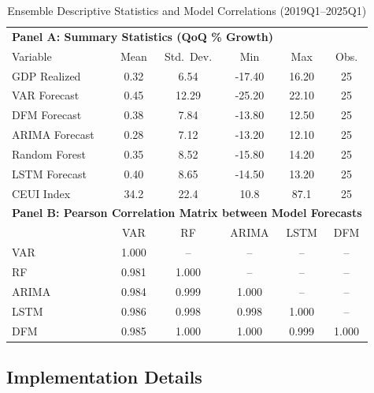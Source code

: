 \documentclass[12pt,a4paper]{article}
\theoremstyle{remark}
\begin{document}
\begin{table}[ht]
\centering
\begin{threeparttable}
\caption{Ensemble Descriptive Statistics and Model Correlations (2019Q1--2025Q1)}
\label{tab:descriptive_stats}
\scriptsize
\begin{tabular}{lccccc}
\toprule
\multicolumn{6}{l}{\textbf{Panel A: Summary Statistics (QoQ \% Growth)}} \\
Variable & Mean & Std.\ Dev. & Min & Max & Obs. \\
\midrule
GDP Realized & 0.32 & 6.54 & -17.40 & 16.20 & 25 \\
VAR Forecast & 0.45 & 12.29 & -25.20 & 22.10 & 25 \\
DFM Forecast & 0.38 & 7.84 & -13.80 & 12.50 & 25 \\
ARIMA Forecast & 0.28 & 7.12 & -13.20 & 12.10 & 25 \\
Random Forest & 0.35 & 8.52 & -15.80 & 14.20 & 25 \\
LSTM Forecast & 0.40 & 8.65 & -14.50 & 13.20 & 25 \\
\midrule
CEUI Index & 34.2 & 22.4 & 10.8 & 87.1 & 25 \\
\midrule
\multicolumn{6}{l}{\textbf{Panel B: Pearson Correlation Matrix between Model Forecasts}} \\
 & VAR & RF & ARIMA & LSTM & DFM \\
\midrule
VAR & 1.000 & -- & -- & -- & -- \\
RF & 0.981 & 1.000 & -- & -- & -- \\
ARIMA & 0.984 & 0.999 & 1.000 & -- & -- \\
LSTM & 0.986 & 0.998 & 0.998 & 1.000 & -- \\
DFM & 0.985 & 1.000 & 1.000 & 0.999 & 1.000 \\
\bottomrule
\end{tabular}
\end{threeparttable}
\end{table}
\subsection{Implementation Details}
\end{document}
